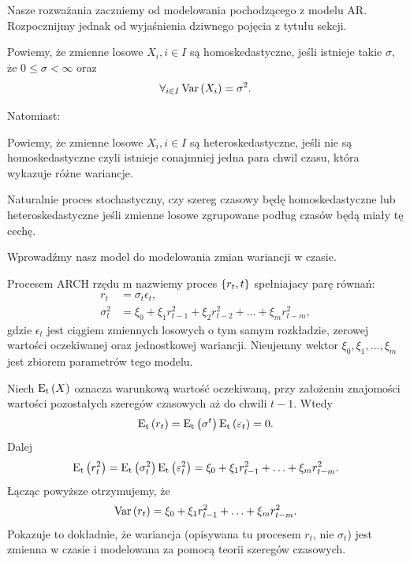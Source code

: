 \documentclass[10pt,a4paper]{book}
\begin{document}
Nasze rozważania zaczniemy od modelowania pochodzącego z modelu AR. Rozpocznijmy jednak od wyjaśnienia dziwnego pojęcia z tytułu sekcji.

\begin{definition}[Homoskedastyczność]
Powiemy, że zmienne losowe $ X_i, i \in I$ są homoskedastyczne, jeśli istnieje takie $\sigma$, że $0 \leq \sigma < \infty$ oraz
$$
\forall_{i \in I} \Variance{X_i} = \sigma^2.
$$
\end{definition}

Natomiast:

\begin{definition}[Heteroskedastyczność]
Powiemy, że zmienne losowe $ X_i, i \in I$ są heteroskedastyczne, jeśli nie są homoskedastyczne czyli istnieje conajmniej jedna para chwil czasu, która wykazuje różne wariancje. 
\end{definition}

Naturalnie proces stochastyczny, czy szereg czasowy będę homoskedastyczne lub heteroskedastyczne jeśli zmienne losowe zgrupowane podług czasów będą miały tę cechę.

Wprowadźmy nasz model do modelowania zmian wariancji w czasie.

\begin{definition}
Procesem ARCH rzędu m nazwiemy proces $\stochasticprocess{r_t}{t}$ spełniajacy parę równań:
\begin{align*}
r_t &= \sigma_t \epsilon_t,\\
\sigma^2_t &= \xi_0 + \xi_1 r_{t-1}^2 + \xi_2 r_{t-2}^2 + \ldots + \xi_m r_{t-m}^2,
\end{align*}
gdzie $\epsilon_t$ jest ciągiem zmiennych losowych o tym samym rozkładzie, zerowej wartości oczekiwanej oraz jednostkowej wariancji. Nieujemny wektor $\xi_0, \xi_1, \ldots, \xi_m$ jest zbiorem parametrów tego modelu.
\end{definition}

\begin{remark}
Niech $\Ex[E_t]{X}$ oznacza warunkową wartość oczekiwaną, przy założeniu znajomości wartości pozostałych szeregów czasowych aż do chwili $t-1$. Wtedy
$$
\Ex[E_t]{r_t} = \Ex[E_t]{\sigma^t} \Ex[E_t]{ \epsilon_t} = 0.
$$
Dalej
$$
\Ex[E_t]{r_t^2} = \Ex[E_t]{\sigma_t^2} \Ex[E_t]{\epsilon_t^2} = \xi_0 + \xi_1 r_{t-1}^2 + \ldots + \xi_m r_{t-m}^2.
$$
Łącząc powyższe otrzymujemy, że
$$
\Variance{r_t } =  \xi_0 + \xi_1 r_{t-1}^2 + \ldots + \xi_m r_{t-m}^2.
$$
Pokazuje to dokładnie, że wariancja (opisywana tu procesem $r_t$, nie $\sigma_t$) jest zmienna w czasie i modelowana za pomocą teorii szeregów czasowych.
\end{remark}
\end{document}
